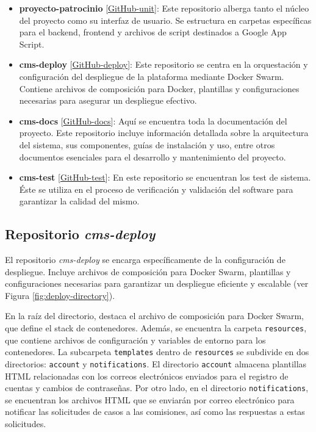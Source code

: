 \begin{itemize}
    \item \textbf{proyecto-patrocinio} [\href{https://github.com/proyecto-patrocinio}{GitHub-unit}]: Este repositorio alberga tanto el núcleo del proyecto como su interfaz de usuario. Se estructura en carpetas específicas para el backend, frontend y archivos de script destinados a Google App Script.
    
    \item \textbf{cms-deploy} [\href{https://github.com/proyecto-patrocinio/cms-deploy}{GitHub-deploy}]: Este repositorio se centra en la orquestación y configuración del despliegue de la plataforma mediante Docker Swarm. Contiene archivos de composición para Docker, plantillas y configuraciones necesarias para asegurar un despliegue efectivo.
    
    \item \textbf{cms-docs} [\href{https://github.com/proyecto-patrocinio/cms-docs}{GitHub-docs}]: Aquí se encuentra toda la documentación del proyecto. Este repositorio incluye información detallada sobre la arquitectura del sistema, sus componentes, guías de instalación y uso, entre otros documentos esenciales para el desarrollo y mantenimiento del proyecto.

    \item \textbf{cms-test} [\href{https://github.com/proyecto-patrocinio/cms-test}{GitHub-test}]: En este repositorio se encuentran los test de sistema. Éste se utiliza en el proceso de verificación y validación del software para garantizar la calidad del mismo.
\end{itemize}

\subsection{Repositorio \textit{cms-deploy}}\label{subsec:directory-deploy}

El repositorio \textit{cms-deploy} se encarga específicamente de la configuración de despliegue. Incluye archivos de composición para Docker Swarm, plantillas y configuraciones necesarias para garantizar un despliegue eficiente y escalable (ver Figura \ref{fig:deploy-directory}).


En la raíz del directorio, destaca el archivo de composición para Docker Swarm, que define el stack de contenedores. Además, se encuentra la carpeta \texttt{resources}, que contiene archivos de configuración y variables de entorno para los contenedores. La subcarpeta \texttt{templates} dentro de \texttt{resources} se subdivide en dos directorios: \texttt{account} y \texttt{notifications}. El directorio \texttt{account} almacena plantillas HTML relacionadas con los correos electrónicos enviados para el registro de cuentas y cambios de contraseñas. Por otro lado, en el directorio \texttt{notifications}, se encuentran los archivos HTML que se enviarán por correo electrónico para notificar las solicitudes de casos a las comisiones, así como las respuestas a estas solicitudes. 



